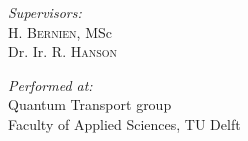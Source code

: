 \documentclass[a4paper,10pt]{report}
\begin{document}
\begin{minipage}{0.5\textwidth}
\begin{flushleft} \large
\emph{Supervisors:}\\
H. \textsc{Bernien}, MSc \\
Dr. Ir. R. \textsc{Hanson}
\end{flushleft}
\end{minipage}
\begin{minipage}{0.5\textwidth}
\begin{flushright} \large
\emph{Performed at:} \\
Quantum Transport group \\
Faculty of Applied Sciences, TU Delft
\end{flushright}
\end{minipage}





\normalsize

\newpage
\end{document}
